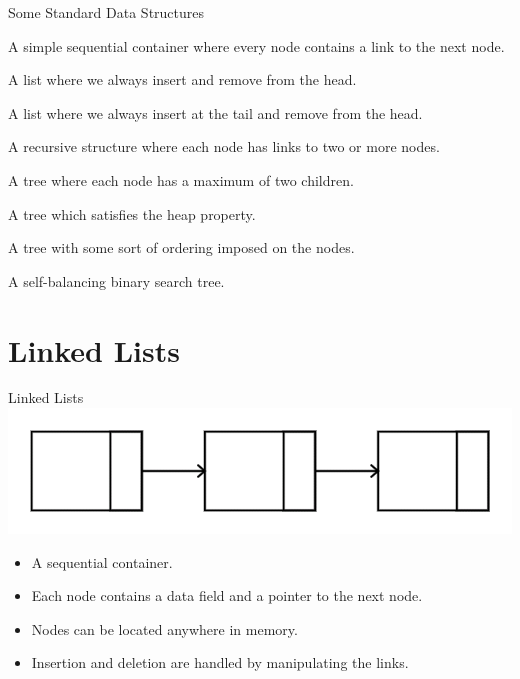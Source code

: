 \documentclass{beamer}
\begin{document}
\begin{frame}{Some Standard Data Structures}
    \begin{description}[<+->]
    \item[Linked List] A simple sequential container where every node contains a link to the next node.
    \item[Stack] A list where we always insert and remove from the head.
    \item[Queue] A list where we always insert at the tail and remove from the head.
    \item[Tree] A recursive structure where each node has links to two or more nodes.
    \item[Binary Tree] A tree where each node has a maximum of two children.
    \item[Heap] A tree which satisfies the heap property.
    \item[Search Tree] A tree with some sort of ordering imposed on the nodes.
    \item[Red-Black Tree] A self-balancing binary search tree.
    \end{description}
\end{frame}

\section{Linked Lists}
\begin{frame}{Linked Lists}
    \includegraphics[height=0.25\textheight]{images/LinkedList}
    \begin{itemize}[<+->]
        \item A sequential container.
        \item Each node contains a data field and a pointer to the next node.
        \item Nodes can be located anywhere in memory.
        \item Insertion and deletion are handled by manipulating the links.
    \end{itemize}
\end{frame}
\end{document}
